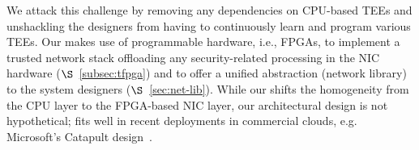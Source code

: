  We attack this challenge by removing any dependencies on CPU-based TEEs and unshackling the designers from having to continuously learn and program various TEEs. Our \projecttitle{} makes use of programmable hardware, i.e., FPGAs, to implement a trusted network stack offloading any security-related processing in the NIC hardware ($\S$~\ref{subsec:tfpga}) and to offer a unified abstraction (network library) to the system designers ($\S$~\ref{sec:net-lib}). While our \projecttitle{} shifts the homogeneity from the CPU layer to the FPGA-based NIC layer, our architectural design is not hypothetical; \projecttitle{} fits well in recent deployments in commercial clouds, e.g. Microsoft's Catapult design~\cite{msr_smartnics, 211249}. 



